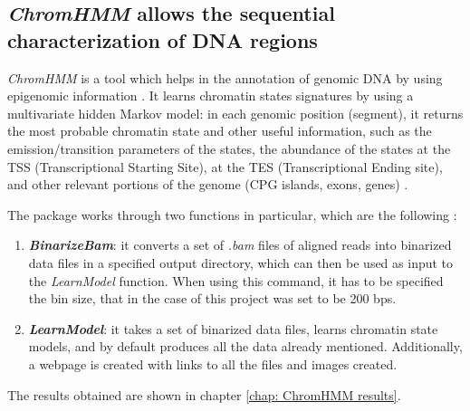 \subsection{\textit{ChromHMM} allows the sequential characterization of DNA regions} \label{intro: chromhmm}
\textit{ChromHMM} is a tool which helps in the annotation of genomic DNA by using epigenomic information
\cite{ernstChromatinstateDiscoveryGenome2017}.
It learns chromatin states signatures by using a multivariate hidden Markov model: in each genomic position (segment), it returns the most probable chromatin state and other useful information, such as the emission/transition parameters of the states, the abundance of the states at the TSS (Transcriptional Starting Site), at the TES (Transcriptional Ending site), and other relevant portions of the genome (CPG islands, exons, genes)
\cite{chilledhousevibesLearningChromatinStates2015,ernstChromatinstateDiscoveryGenome2017}. 

The package works through two functions in particular, which are the following
\cite{ernstChromatinstateDiscoveryGenome2017}:
\begin{enumerate}
    \item \textbf{\textit{BinarizeBam}}: it converts a set of \textit{.bam} files of aligned reads into binarized data files in a specified output directory, which can then be used as input to the \textit{LearnModel} function. When using this command, it has to be specified the bin size, that in the case of this project was set to be 200 bps.
    \item  \textbf{\textit{LearnModel}}: it takes a set of binarized data files, learns chromatin state models, and by default produces all the data already mentioned. Additionally, a webpage is created with links to all the files and images created.
\end{enumerate}

The results obtained are shown in chapter \ref{chap: ChromHMM results}.
